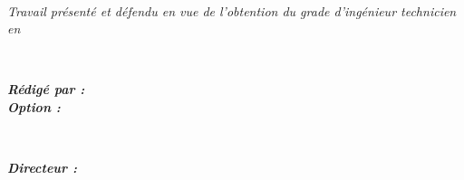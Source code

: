 \begin{titlepage}
	\textbf{\TTfc}
	
	\HRule\\[1.5cm]
	\hfill
	\begin{minipage}{0.6\linewidth}
		\textit{Travail présenté et défendu en vue de l’obtention
		du grade d’ingénieur technicien en \Filiere}\\
	\end{minipage}
	\\
	\hfill
	\begin{minipage}{0.6\textwidth}
		\textit{\textbf{Rédigé par : \ATfc}}
		\\
		\textit{\textbf{Option  : \Filiere}}\\
	\end{minipage}
	\\
	\hfill
	\begin{minipage}{0.6\textwidth}
		\textit{\textbf{Directeur : \DTfc}}
	\end{minipage}
	
	
	\vfill\vfill\vfill %
	
	\textbf{\MATfc}
\end{titlepage}
